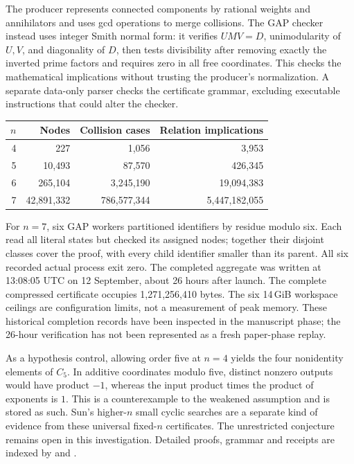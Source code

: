 The producer represents connected components by rational weights
and annihilators and uses gcd operations to merge collisions.
The GAP checker instead uses integer Smith normal form:
it verifies \(UMV=D\), unimodularity of \(U,V\), and diagonality
of \(D\), then tests divisibility after removing exactly the
inverted prime factors and requires zero in all free coordinates.
This checks the mathematical implications without trusting the
producer's normalization. A separate data-only parser checks the
certificate grammar, excluding executable instructions that could
alter the checker.

\begin{center}\small
\begin{tabular}{@{}rrrr@{}}
\toprule
\(n\)&Nodes&Collision cases&Relation implications\\\midrule
4&227&1,056&3,953\\
5&10,493&87,570&426,345\\
6&265,104&3,245,190&19,094,383\\
7&42,891,332&786,577,344&5,447,182,055\\
\bottomrule
\end{tabular}
\end{center}

For \(n=7\), six GAP workers partitioned identifiers by residue
modulo six. Each read all literal states but checked its assigned
nodes; together their disjoint classes cover the proof, with
every child identifier smaller than its parent. All six recorded
actual process exit zero. The completed aggregate was written
at 13:08:05 UTC on 12 September, about 26 hours after launch.
The complete compressed certificate occupies 1,271,256,410 bytes.
The six 14\,GiB workspace ceilings are configuration limits,
not a measurement of peak memory.
These historical completion records have been inspected in the
manuscript phase; the 26-hour verification has not been represented
as a fresh paper-phase replay.

As a hypothesis control, allowing order five at \(n=4\) yields
the four nonidentity elements of \(C_5\). In additive coordinates
modulo five, distinct nonzero outputs would have product \(-1\),
whereas the input product times the product of exponents is \(1\).
This is a counterexample to the weakened assumption and is stored
as such. Sun's higher-\(n\) small cyclic searches are a separate
kind of evidence from these universal fixed-\(n\) certificates.
The unrestricted conjecture remains open in this investigation.
Detailed proofs, grammar and receipts are indexed by
 and
.
